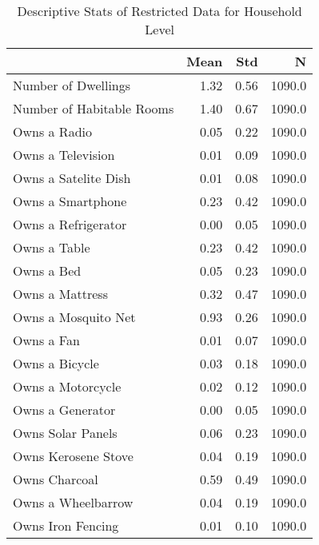 \begin{longtable}{lrrr}
\caption{Descriptive Stats of  Restricted Data for Household Level}
\label{table:2}

\\\hline
{} &  Mean &   Std &       N \\
\hline
\endhead

\hline
\endfoot


Number of Dwellings                      &  1.32 &  0.56 &  1090.0 \\
Number of Habitable Rooms                &  1.40 &  0.67 &  1090.0 \\
Owns a Radio                             &  0.05 &  0.22 &  1090.0 \\
Owns a Television                        &  0.01 &  0.09 &  1090.0 \\
Owns a Satelite Dish                     &  0.01 &  0.08 &  1090.0 \\
Owns a Smartphone                        &  0.23 &  0.42 &  1090.0 \\
Owns a Refrigerator                      &  0.00 &  0.05 &  1090.0 \\
Owns a Table                             &  0.23 &  0.42 &  1090.0 \\
Owns a Bed                               &  0.05 &  0.23 &  1090.0 \\
Owns a Mattress                          &  0.32 &  0.47 &  1090.0 \\
Owns a Mosquito Net                      &  0.93 &  0.26 &  1090.0 \\
Owns a Fan                               &  0.01 &  0.07 &  1090.0 \\
Owns a Bicycle                           &  0.03 &  0.18 &  1090.0 \\
Owns a Motorcycle                        &  0.02 &  0.12 &  1090.0 \\
Owns a Generator                         &  0.00 &  0.05 &  1090.0 \\
Owns Solar Panels                        &  0.06 &  0.23 &  1090.0 \\
Owns Kerosene Stove                      &  0.04 &  0.19 &  1090.0 \\
Owns Charcoal                            &  0.59 &  0.49 &  1090.0 \\
Owns a Wheelbarrow                       &  0.04 &  0.19 &  1090.0 \\
Owns Iron Fencing                        &  0.01 &  0.10 &  1090.0 \\

\end{longtable}
